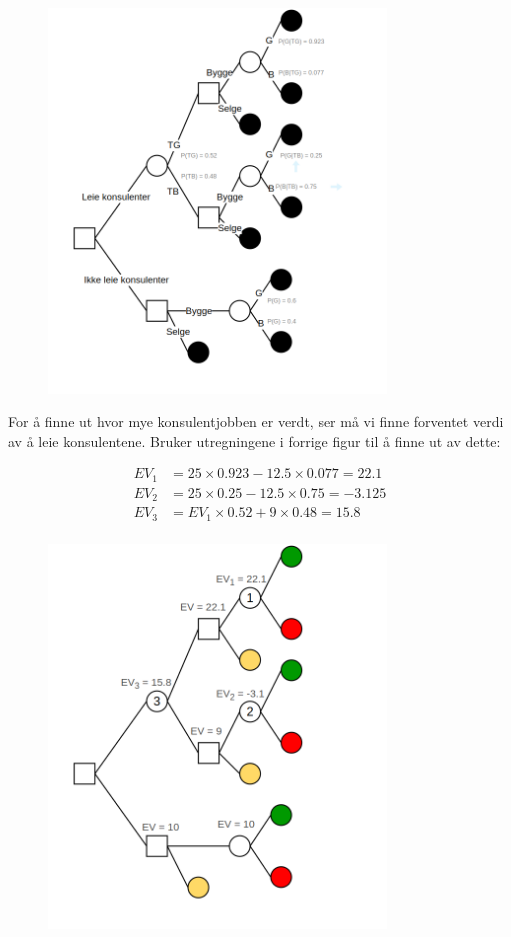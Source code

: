 \documentclass{article}
\begin{document}
\begin{figure}[ht]
  \centering
  \includegraphics*[width=0.8\textwidth]{img/1c.PNG}
\end{figure}

For å finne ut hvor mye konsulentjobben er verdt, ser må vi finne forventet verdi av å leie konsulentene. Bruker utregningene i forrige figur til å finne ut av dette:

\begin{align*}
  EV_1 &= 25 \times 0.923 - 12.5 \times 0.077 = 22.1 \\
  EV_2 &= 25 \times 0.25 - 12.5 \times 0.75 = -3.125 \\
  EV_3 &= EV_1 \times 0.52 + 9 \times 0.48 = 15.8 \\ 
\end{align*}


\begin{figure}[ht]
  \centering
  \includegraphics*[width=0.8\textwidth]{img/1c2.PNG}
\end{figure}
\end{document}
